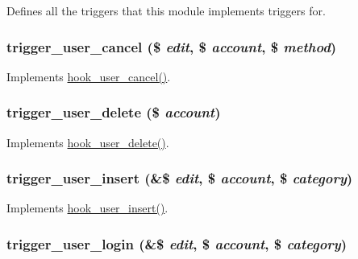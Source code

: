 Defines all the triggers that this module implements triggers for. \hypertarget{trigger_8module_a4916950219650ff95ca978fe761021b8}{
\subsubsection[{trigger\_\-user\_\-cancel}]{\setlength{\rightskip}{0pt plus 5cm}trigger\_\-user\_\-cancel (\$ {\em edit}, \/  \$ {\em account}, \/  \$ {\em method})}}
\label{trigger_8module_a4916950219650ff95ca978fe761021b8}
Implements \hyperlink{group__hooks_gad6223ddd2f0f52c331df8a3315d9a41e}{hook\_\-user\_\-cancel()}. \hypertarget{trigger_8module_aeee8f35a9021d3eccd2290bf4be6b054}{
\subsubsection[{trigger\_\-user\_\-delete}]{\setlength{\rightskip}{0pt plus 5cm}trigger\_\-user\_\-delete (\$ {\em account})}}
\label{trigger_8module_aeee8f35a9021d3eccd2290bf4be6b054}
Implements \hyperlink{group__hooks_ga2c0755857e486e8a770b44b496da9929}{hook\_\-user\_\-delete()}. \hypertarget{trigger_8module_addce21e705c500c2172debc5a634056c}{
\subsubsection[{trigger\_\-user\_\-insert}]{\setlength{\rightskip}{0pt plus 5cm}trigger\_\-user\_\-insert (\&\$ {\em edit}, \/  \$ {\em account}, \/  \$ {\em category})}}
\label{trigger_8module_addce21e705c500c2172debc5a634056c}
Implements \hyperlink{group__hooks_gaa3e2c4c972ee796d216b15da7aaf9c2c}{hook\_\-user\_\-insert()}. \hypertarget{trigger_8module_a2957541441d3ecd139d7d4e295739c43}{
\subsubsection[{trigger\_\-user\_\-login}]{\setlength{\rightskip}{0pt plus 5cm}trigger\_\-user\_\-login (\&\$ {\em edit}, \/  \$ {\em account}, \/  \$ {\em category})}}
